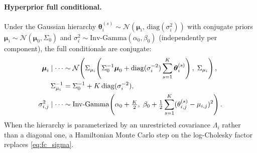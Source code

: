\documentclass[12pt]{article}
\theoremstyle{plain}
\theoremstyle{definition}
\theoremstyle{remark}
\begin{document}
\paragraph{Hyperprior full conditional.}
Under the Gaussian hierarchy
$\boldsymbol\theta_i^{(s)}\sim\mathcal{N}(\boldsymbol\mu_i,\,\mathrm{diag}(\sigma_i^2))$
with conjugate priors
$\boldsymbol\mu_i\sim\mathcal{N}(\boldsymbol\mu_0,\Sigma_0)$ and
$\sigma_i^2\sim\mathrm{Inv\text{-}Gamma}(\alpha_0,\beta_0)$ (independently per
component), the full conditionals are conjugate:
%
\begin{align}
  \boldsymbol\mu_i \mid \cdots &\sim
    \mathcal{N}\!\left(\Sigma_{\mu_i}\!\left(\Sigma_0^{-1}\boldsymbol\mu_0
      + \mathrm{diag}(\sigma_i^{-2})\sum_{s=1}^{K}\boldsymbol\theta_i^{(s)}\right),\;
      \Sigma_{\mu_i}\right),\notag\\
  \Sigma_{\mu_i}^{-1} &= \Sigma_0^{-1} + K\,\mathrm{diag}(\sigma_i^{-2}),
  \label{eq:fc_mu}\\
  \sigma_{i,j}^2 \mid \cdots &\sim
    \mathrm{Inv\text{-}Gamma}\!\left(\alpha_0 + \tfrac{K}{2},\;
      \beta_0 + \tfrac{1}{2}\sum_{s=1}^{K}(\theta_{i,j}^{(s)}-\mu_{i,j})^2\right).
  \label{eq:fc_sigma}
\end{align}
%
When the hierarchy is parameterized by an unrestricted covariance $\Lambda_i$
rather than a diagonal one, a Hamiltonian Monte Carlo step on the
log-Cholesky factor replaces \eqref{eq:fc_sigma}.
\end{document}
